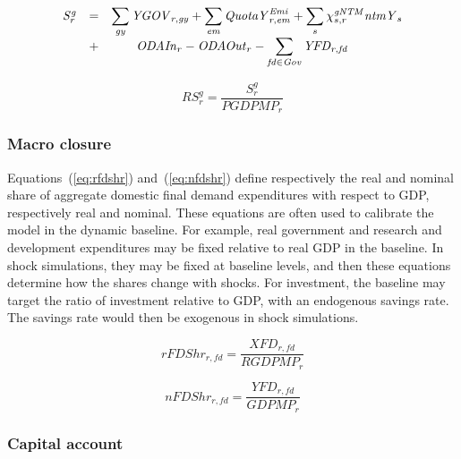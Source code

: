 \documentclass[11pt,letterpaper]{report}
\begin{document}
\begin{equation}
\label{eq:savg}
\begin{array}{l l l}
\mathit{S^g_r} & = & \displaystyle
   \sum_{\mathit{gy}} {\mathit{YGOV}_{r,\mathit{gy}}} +
   \sum_{\mathit{em}} {\mathit{QuotaY}^{\mathit{Emi}}_{r,\mathit{em}}} +
   \sum_s{\chi^{\mathit{gNTM}}_{s,r} \mathit{ntmY}_s} \\
{} & + & \qquad \displaystyle \mathit{ODAIn}_r - \mathit{ODAOut}_r
   -   \sum_{\mathit{fd} \in {\mathit{Gov}}}{\mathit{YFD}_{r,\mathit{fd}}}
\end{array}
\end{equation}

\begin{equation}
\label{eq:rsavg}
\mathit{RS}^g_r = \frac{S^g_r} {\mathit{PGDPMP}_{r}}
\end{equation}

\subsubsection{Macro closure}

Equations~(\ref{eq:rfdshr}) and~(\ref{eq:nfdshr})
define respectively the real and nominal share
of aggregate domestic final demand expenditures with
respect to GDP, respectively real and nominal. These
equations are often used to calibrate the model
in the dynamic baseline. For example, real government
and research and development expenditures may
be fixed relative to real GDP in the baseline. In
shock simulations, they may be fixed at baseline
levels, and then these equations determine how the
shares change with shocks. For investment, the
baseline may target the ratio of investment relative
to GDP, with an endogenous savings rate. The savings
rate would then be exogenous in shock simulations.

\begin{equation}
\label{eq:rfdshr}
\mathit{rFDShr}_{r,\mathit{fd}}
	= \frac{\mathit{XFD}_{r,\mathit{fd}} } {\mathit{RGDPMP}_{r}}
\end{equation}

\begin{equation}
\label{eq:nfdshr}
\mathit{nFDShr}_{r,\mathit{fd}}
= \frac{\mathit{YFD}_{r,\mathit{fd}} } {\mathit{GDPMP}_{r}}
\end{equation}

\subsubsection{Capital account}
\end{document}
